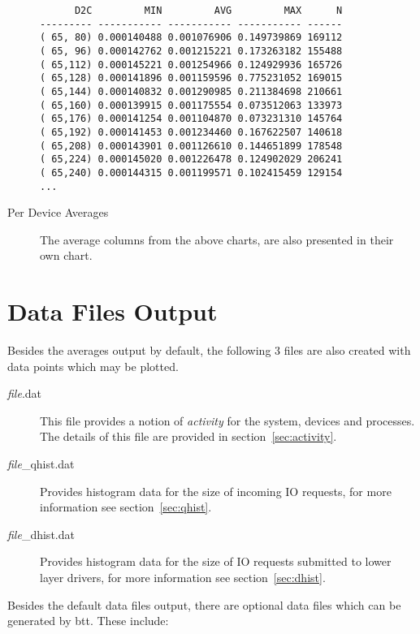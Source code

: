 \documentclass{article}
\begin{document}
\begin{description}
\begin{verbatim}
      D2C         MIN         AVG         MAX      N
--------- ----------- ----------- ----------- ------
( 65, 80) 0.000140488 0.001076906 0.149739869 169112
( 65, 96) 0.000142762 0.001215221 0.173263182 155488
( 65,112) 0.000145221 0.001254966 0.124929936 165726
( 65,128) 0.000141896 0.001159596 0.775231052 169015
( 65,144) 0.000140832 0.001290985 0.211384698 210661
( 65,160) 0.000139915 0.001175554 0.073512063 133973
( 65,176) 0.000141254 0.001104870 0.073231310 145764
( 65,192) 0.000141453 0.001234460 0.167622507 140618
( 65,208) 0.000143901 0.001126610 0.144651899 178548
( 65,224) 0.000145020 0.001226478 0.124902029 206241
( 65,240) 0.000144315 0.001199571 0.102415459 129154
...
\end{verbatim}

  \item[Per Device Averages] The average columns from the above charts,
  are also presented in their own chart.
\end{description}

\newpage\section{\label{sec:data-files}Data Files Output}

  Besides the averages output by default, the following 3 files are also
  created with data points which may be plotted.

\begin{description}
  \item[\emph{file}.dat] This file provides a notion of \emph{activity}
  for the system, devices and processes. The details of this file are
  provided in section~\ref{sec:activity}.

  \item[\emph{file}\_qhist.dat] Provides histogram data for the size of
  incoming IO requests, for more information see section~\ref{sec:qhist}.

  \item[\emph{file}\_dhist.dat] Provides histogram data for the size
  of IO requests submitted to lower layer drivers, for more information
  see section~\ref{sec:dhist}.

\end{description}

  Besides the default data files output, there are optional data files
  which can be generated by btt. These include:
\end{document}
